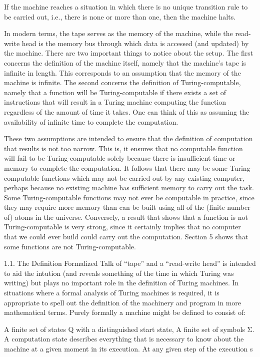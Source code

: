 If the machine reaches a situation in which there is no unique transition rule to be carried out, i.e., there is none or more than one, then the machine halts.

In modern terms, the tape serves as the memory of the machine, while the read-write head is the memory bus through which data is accessed (and updated) by the machine. There are two important things to notice about the setup. The first concerns the definition of the machine itself, namely that the machine's tape is infinite in length. This corresponds to an assumption that the memory of the machine is infinite. The second concerns the definition of Turing-computable, namely that a function will be Turing-computable if there exists a set of instructions that will result in a Turing machine computing the function regardless of the amount of time it takes. One can think of this as assuming the availability of infinite time to complete the computation.

These two assumptions are intended to ensure that the definition of computation that results is not too narrow. This is, it ensures that no computable function will fail to be Turing-computable solely because there is insufficient time or memory to complete the computation. It follows that there may be some Turing-computable functions which may not be carried out by any existing computer, perhaps because no existing machine has sufficient memory to carry out the task. Some Turing-computable functions may not ever be computable in practice, since they may require more memory than can be built using all of the (finite number of) atoms in the universe. Conversely, a result that shows that a function is not Turing-computable is very strong, since it certainly implies that no computer that we could ever build could carry out the computation. Section 5 shows that some functions are not Turing-computable.

1.1. The Definition Formalized
Talk of “tape” and a “read-write head” is intended to aid the intution (and reveals something of the time in which Turing was writing) but plays no important role in the definition of Turing machines. In situations where a formal analysis of Turing machines is required, it is appropriate to spell out the definition of the machinery and program in more mathematical terms. Purely formally a machine might be defined to consist of:

A finite set of states Q with a distinguished start state,
A finite set of symbols Σ.
A computation state describes everything that is necessary to know about the machine at a given moment in its execution. At any given step of the execution s

